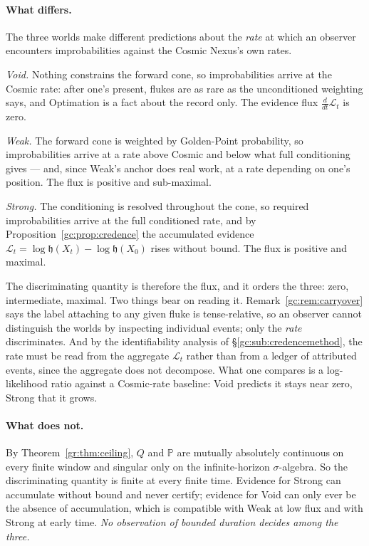 \documentclass[11pt]{article}
\numberwithin{equation}{section}
\theoremstyle{plain}
\theoremstyle{definition}
\theoremstyle{remark}
\newcommand{\PP}{\mathbb{P}}
\newcommand{\Lc}{\mathcal{L}}
\newcommand{\hm}{\mathfrak{h}}
\begin{document}
\paragraph{What differs.} The three worlds make different predictions
about the \emph{rate} at which an observer encounters improbabilities
against the Cosmic Nexus's own rates.

\emph{Void.} Nothing constrains the forward cone, so improbabilities
arrive at the Cosmic rate: after one's present, flukes are as rare as the
unconditioned weighting says, and Optimation is a fact about the record
only. The evidence flux $\tfrac{d}{dt}\Lc_t$ is zero.

\emph{Weak.} The forward cone is weighted by Golden-Point probability, so
improbabilities arrive at a rate above Cosmic and below what full
conditioning gives --- and, since Weak's anchor does real work, at a rate
depending on one's position. The flux is positive and sub-maximal.

\emph{Strong.} The conditioning is resolved throughout the cone, so
required improbabilities arrive at the full conditioned rate, and by
Proposition~\ref{gc:prop:credence} the accumulated evidence
$\Lc_t=\log\hm(X_t)-\log\hm(X_0)$ rises without bound. The flux is
positive and maximal.

The discriminating quantity is therefore the flux, and it orders the
three: zero, intermediate, maximal. Two things bear on reading it.
Remark~\ref{gc:rem:carryover} says the label attaching to any given fluke
is tense-relative, so an observer cannot distinguish the worlds by
inspecting individual events; only the \emph{rate} discriminates. And by
the identifiability analysis of \S\ref{gc:sub:credencemethod}, the rate
must be read from the aggregate $\Lc_t$ rather than from a ledger of
attributed events, since the aggregate does not decompose. What one
compares is a log-likelihood ratio against a Cosmic-rate baseline: Void
predicts it stays near zero, Strong that it grows.

\paragraph{What does not.} By Theorem~\ref{gr:thm:ceiling}, $Q$ and $\PP$
are mutually absolutely continuous on every finite window and singular
only on the infinite-horizon $\sigma$-algebra. So the discriminating
quantity is finite at every finite time. Evidence for Strong can
accumulate without bound and never certify; evidence for Void can only
ever be the absence of accumulation, which is compatible with Weak at low
flux and with Strong at early time. \emph{No observation of bounded
duration decides among the three.}
\end{document}
